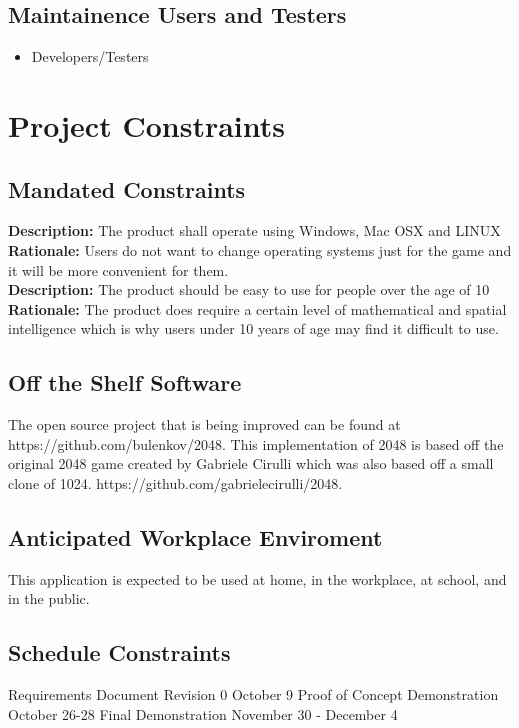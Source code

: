 \documentclass[12pt]{article}
\begin{document}
\subsection{Maintainence Users and Testers}
\begin{itemize}
\item Developers/Testers
\end{itemize}

\section{Project Constraints}
\subsection{Mandated Constraints}
\textbf{Description:} The product shall operate using Windows, Mac OSX and LINUX
\textbf{Rationale:} Users do not want to change operating systems just for the game and it will be more convenient for them.\\
\textbf{Description:} The product should be easy to use for people over the age of 10
\textbf{Rationale:} The product does require a certain level of mathematical and spatial intelligence which is why users under 10 years of age may find it difficult to use. 
\subsection{Off the Shelf Software}
\par\indent\indent The open source project that is being improved can be found
at\\ https://github.com/bulenkov/2048.
This implementation of 2048 is based off the original 2048 game created by Gabriele Cirulli which was also based off a small clone of 1024. https://github.com/gabrielecirulli/2048.
\subsection{Anticipated Workplace Enviroment}
This application is expected to be used at home, in the workplace, at school, and in the public.\newline
\subsection{Schedule Constraints}
Requirements Document Revision 0	\hfill	October 9 \newline
Proof of Concept Demonstration \hfill		October 26-28 \newline
Final Demonstration \hfill				November 30 - December 4 \newline
\end{document}
